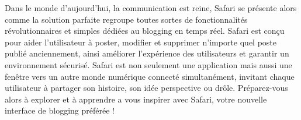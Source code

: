 

%
%

\vspace{1cm}\vspace{1cm}\vspace{1cm}\vspace{1cm}\vspace{1cm}\vspace{1cm}
Dans le monde d'aujourd'hui, la communication est reine, Safari se présente alors comme la solution parfaite regroupe toutes sortes de fonctionnalités révolutionnaires et simples dédiées au blogging en temps réel. Safari est conçu pour aider l'utilisateur à poster, modifier et supprimer n'importe quel poste publié anciennement, ainsi améliorer l'expérience des utilisateurs et garantir un environnement sécurisé.
\vspace{1cm}\vspace{1cm}
Safari est non seulement une application mais aussi une fenêtre vers un autre monde numérique connecté simultanément, invitant chaque utilisateur à partager son histoire, son idée perspective ou drôle. Préparez-vous alors à explorer et à apprendre a vous inspirer avec Safari, votre nouvelle interface de blogging préférée !